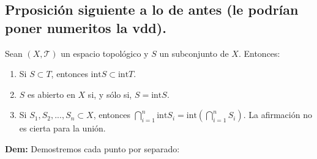 \documentclass{article}
\begin{document}
\subsection{Prposición siguiente a lo de antes (le podrían poner numeritos la vdd).}

Sean $(X, \mathcal{T})$ un espacio topológico y $S$ un subconjunto de $X$. Entonces:

\begin{enumerate}[label=(\textit{\roman*})]
    \item Si $S \subset T$, entonces $\text{int}S \subset \text{int}T$.
    \item $S$ es abierto en $X$ si, y sólo si, $S = \text{int}S$.
    \item Si $S_1, S_2, ..., S_n \subset X$, entonces $\bigcap_{i = 1}^{n} \text{int}S_i = \text{int}\left(\bigcap_{i=1}^{n}S_i\right)$. La afirmación no es cierta para la unión.
\end{enumerate}

\noindent\textbf{Dem:} Demostremos cada punto por separado:
\end{document}
